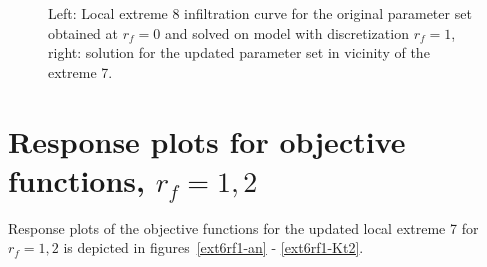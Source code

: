 \documentclass[review,times,3p,twocolumn,10pt]{elsarticle}
\begin{document}
\begin{figure}
\label{rf0rf1img2}
\caption{Left: Local extreme 8 infiltration curve for the original parameter set obtained at $r_f=0$ and solved on model with discretization $r_f=1$, right: solution for the updated parameter set in  vicinity of the extreme 7.}
\end{figure}

\section{Response plots for objective functions, $r_f=1,2$}

Response plots of the objective functions for the updated local extreme 7 for $r_f=1,2$ is depicted in figures~\ref{ext6rf1-an} - \ref{ext6rf1-Kt2}.
\end{document}
